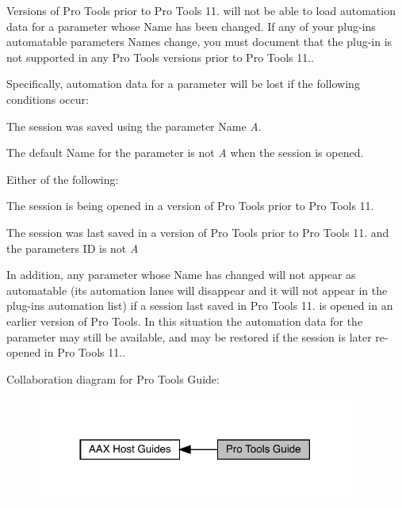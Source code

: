 Versions of Pro Tools prior to Pro Tools 11. will not be able to load automation data for a parameter whose Name has been changed. If any of your plug-\/in\textquotesingle{}s automatable parameters\textquotesingle{} Names change, you must document that the plug-\/in is not supported in any Pro Tools versions prior to Pro Tools 11..

Specifically, automation data for a parameter will be lost if the following conditions occur\+: 
\begin{DoxyItemize}
\item The session was saved using the parameter Name {\itshape A}.  
\item The default Name for the parameter is not {\itshape A} when the session is opened.  
\item Either of the following\+: 
\begin{DoxyItemize}
\item The session is being opened in a version of Pro Tools prior to Pro Tools 11.  
\item The session was last saved in a version of Pro Tools prior to Pro Tools 11. and the parameter\textquotesingle{}s ID is not {\itshape A}  
\end{DoxyItemize}
\end{DoxyItemize}

In addition, any parameter whose Name has changed will not appear as automatable (its automation lanes will disappear and it will not appear in the plug-\/in\textquotesingle{}s automation list) if a session last saved in Pro Tools 11. is opened in an earlier version of Pro Tools. In this situation the automation data for the parameter may still be available, and may be restored if the session is later re-\/opened in Pro Tools 11..

 Collaboration diagram for Pro Tools Guide\+:
\nopagebreak
\begin{figure}[H]
\begin{center}
\leavevmode
\includegraphics[width=297pt]{a00830}
\end{center}
\end{figure}
